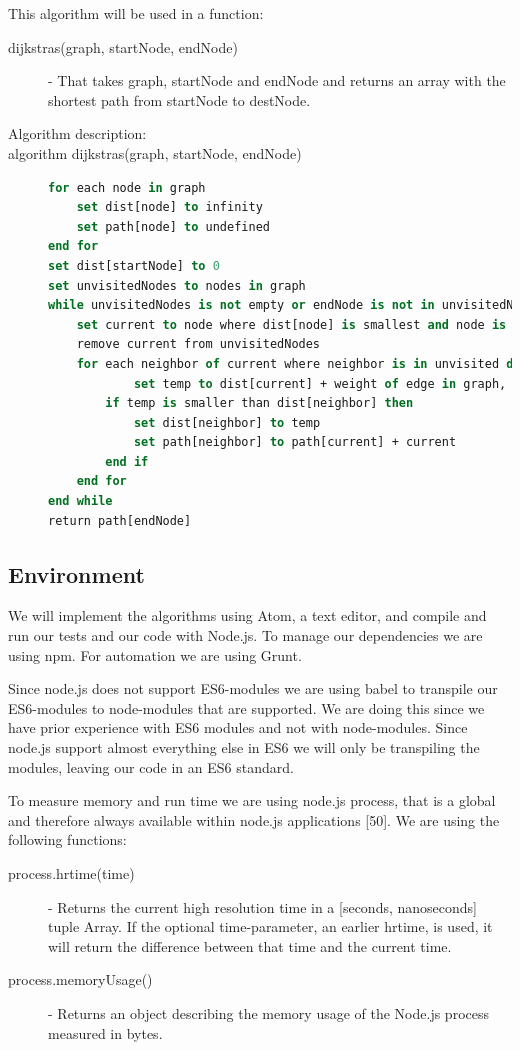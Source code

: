 \documentclass {article}
\begin{document}
This algorithm will be used in a function:
\begin{description}
\item[dijkstras(graph, startNode, endNode)] - That takes graph, startNode and endNode and returns an array with the shortest path from startNode to destNode. 

\item [Algorithm description:]
\item[algorithm dijkstras(graph, startNode, endNode)]
\item[]
\begin{lstlisting}[language=Pascal]
for each node in graph
 	set dist[node] to infinity 
 	set path[node] to undefined 
end for
set dist[startNode] to 0 
set unvisitedNodes to nodes in graph
while unvisitedNodes is not empty or endNode is not in unvisitedNodes do
 	set current to node where dist[node] is smallest and node is in unvisitedNodes
 	remove current from unvisitedNodes
  	for each neighbor of current where neighbor is in unvisited do
    		set temp to dist[current] + weight of edge in graph, where edge is from current to neighbor
 		if temp is smaller than dist[neighbor] then
 			set dist[neighbor] to temp
 			set path[neighbor] to path[current] + current
 		end if
 	end for
end while
return path[endNode]
\end{lstlisting}
\end{description}
\subsection{Environment}
We will implement the algorithms using Atom, a text editor, and compile and run our tests and our code with Node.js. To manage our dependencies we are using npm. For automation we are using Grunt.

Since node.js does not support ES6-modules we are using babel to transpile our ES6-modules to node-modules that are supported. We are doing this since we have prior experience with ES6 modules and not with node-modules. Since node.js support almost everything else in ES6 we will only be transpiling the modules, leaving our code in an ES6 standard.

To measure memory and run time we are using node.js process, that is a global and therefore always available within node.js applications [50]. We are using the following functions:
\begin{description}
\item [process.hrtime(time)] - Returns the current high resolution time in a [seconds, nanoseconds] tuple Array. If the optional time-parameter, an earlier hrtime, is used, it will return the difference between that time and the current time. 
\item [process.memoryUsage()] - Returns an object describing the memory usage of the Node.js process measured in bytes.
\end{description}
\end{document}

